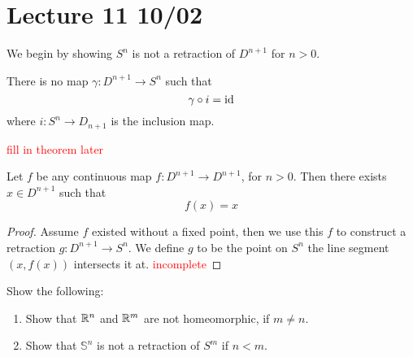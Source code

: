 \section{Lecture 11 10/02}
We begin by showing $S^n$ is not a retraction of $D^{n+1}$ for $n>0$. 
\begin{cor}
    There is no map $\gamma: D^{n+1}\to S^n$ such that 
\begin{equation*}
    \gamma\circ i=\text{id}
\end{equation*}
where $i:S^n\to D_{n+1}$ is the inclusion map.
\end{cor}
\textcolor{red}{fill in theorem later}
\begin{thm}
    Let $f$ be any continuous map $f:D^{n+1}\to D^{n+1}$, for $n>0$. Then there exists $x\in D^{n+1}$ such that 
    \begin{equation*}
        f(x)=x
    \end{equation*}
\end{thm}
\begin{proof}
    Assume $f$ existed without a fixed point, then we use this $f$ to construct a retraction $g:D^{n+1}\to S^n$. We define $g$ to be the point on $S^n$ the line segment $(x,f(x))$ intersects it at. 
    \textcolor{red}{incomplete}
\end{proof}
\begin{prob}
    Show the following:
    \begin{enumerate}
        \item Show that $\mathbb{R}^n$ and $\mathbb{R}^m$ are not homeomorphic, if $m\neq n$.
        \item Show that $\mathbb{S}^n$ is not a retraction of $S^m$ if $n<m$.
        \end{enumerate}
\end{prob}
